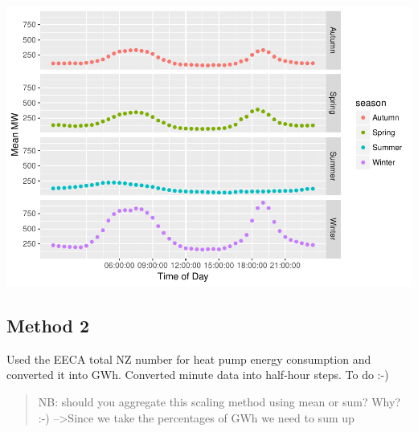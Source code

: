 \documentclass[]{article}
\begin{document}
\includegraphics{heatPumpProfileAnalysis_files/figure-latex/aggregateMethod1-1.pdf}

\subsection{Method 2}\label{method-2}

Used the EECA total NZ number for heat pump energy consumption and
converted it into GWh. Converted minute data into half-hour steps. To do
:-)

\begin{quote}
NB: should you aggregate this scaling method using mean or sum? Why? :-)
--\textgreater{}Since we take the percentages of GWh we need to sum up
\end{quote}
\end{document}

